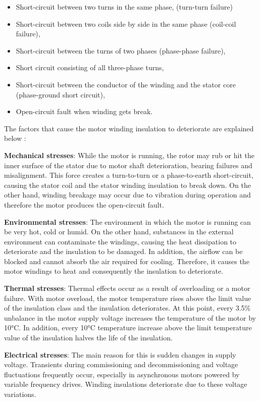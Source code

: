 \begin{itemize}
	\item Short-circuit between two turns in the same phase, (turn-turn failure)
	\item Short-circuit between two coils side by side in the same phase (coil-coil failure),
	\item Short-circuit between the turns of two phases (phase-phase failure),
	\item Short circuit consisting of all three-phase turns,
	\item Short-circuit between the conductor of the winding and the stator core (phase-ground short circuit),
	\item Open-circuit fault when winding gets break.
\end{itemize}

The factors that cause the motor winding insulation to deteriorate are explained below \cite{karmakar2016induction,Siddique,faiz2017fault}:

\textbf{Mechanical stresses}: While the motor is running, the rotor may rub or hit the inner surface of the stator due to motor shaft deterioration, bearing failures and misalignment. This force creates a turn-to-turn or a phase-to-earth short-circuit, causing the stator coil and the stator winding insulation to break down. On the other hand, winding breakage may occur due to vibration during operation and therefore the motor produces the open-circuit fault.

\textbf{Environmental stresses}: The environment in which the motor is running can be very hot, cold or humid. On the other hand, substances in the external environment can contaminate the windings, causing the heat dissipation to deteriorate and the insulation to be damaged. In addition, the airflow can be blocked and cannot absorb the air required for cooling. Therefore, it causes the motor windings to heat and consequently the insulation to deteriorate.

\textbf{Thermal stresses}: Thermal effects occur as a result of overloading or a motor failure. With motor overload, the motor temperature rises above the limit value of the insulation class and the insulation deteriorates. At this point, every 3.5\% unbalance in the motor supply voltage increases the temperature of the motor by 10°C. In addition, every 10°C temperature increase above the limit temperature value of the insulation halves the life of the insulation.

\textbf{Electrical stresses}: The main reason for this is sudden changes in supply voltage. Transients during commissioning and decommissioning and voltage fluctuations frequently occur, especially in asynchronous motors powered by variable frequency drives. Winding insulations deteriorate due to these voltage variations.

